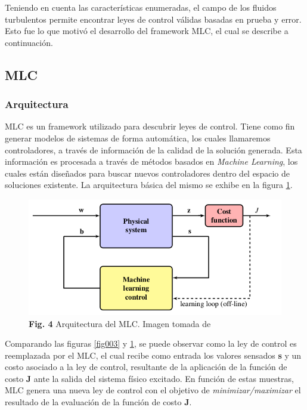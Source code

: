 \documentclass[a4paper,10pt]{article}
\begin{document}
        Teniendo en cuenta las características enumeradas, el campo de los fluidos turbulentos permite encontrar leyes de control válidas
        basadas en prueba y error. Esto fue lo que motivó el desarrollo del framework MLC, el cual se describe a continuación.

    \subsection{MLC} \label{sec:mlc}
    \subsubsection{Arquitectura}
        MLC es un framework utilizado para descubrir leyes de control. Tiene como fin generar modelos de sistemas de forma automática,
        los cuales llamaremos controladores, a través de información de la calidad de la solución generada. Esta información es procesada
        a través de métodos basados en \textit{Machine Learning}, los cuales están diseñados para buscar nuevos controladores dentro del
        espacio de soluciones existente. La arquitectura básica del mismo se exhibe en la figura \ref{fig004}.

        \begin{figure}[!Hhtb]
            \centering
            \includegraphics[width=12cm,origin=c]{Imagenes/MLC_architecture.png}
            \caption{\textbf{Fig. 4} Arquitectura del MLC. Imagen tomada de \cite{Duriez2016}} \label{fig004}
        \end{figure}

        \indent Comparando las figuras \ref{fig003} y \ref{fig004}, se puede observar como la ley de control es reemplazada por el MLC, 
        el cual recibe como entrada los valores sensados \textbf{s} y un costo asociado a la ley de control, resultante de la aplicación 
        de la función de costo \textbf{J} ante la salida del sistema físico excitado. En función de estas muestras, MLC genera una nueva 
        ley de control con el objetivo de \textit{minimizar/maximizar} el resultado de la evaluación de la función de costo 
        \textbf{J}.
\end{document}
